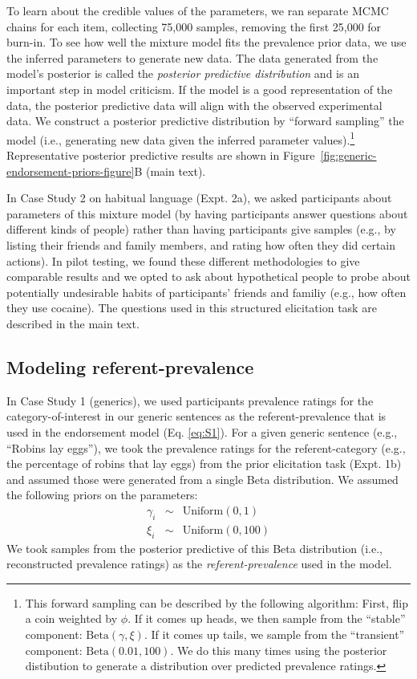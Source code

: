 \documentclass[english,,man,floatsintext]{apa6}
\let\rmarkdownfootnote\footnote%
\def\footnote{\protect\rmarkdownfootnote}
\theoremstyle{definition}
\theoremstyle{definition}
\theoremstyle{definition}
\theoremstyle{remark}
\begin{document}
To learn about the credible values of the parameters, we ran separate
MCMC chains for each item, collecting 75,000 samples, removing the first
25,000 for burn-in. To see how well the mixture model fits the
prevalence prior data, we use the inferred parameters to generate new
data. The data generated from the model's posterior is called the
\emph{posterior predictive distribution} and is an important step in
model criticism. If the model is a good representation of the data, the
posterior predictive data will align with the observed experimental
data. We construct a posterior predictive distribution by
\enquote{forward sampling} the model (i.e., generating new data given
the inferred parameter values).\footnote{This forward sampling can be
  described by the following algorithm: First, flip a coin weighted by
  \(\phi\). If it comes up heads, we then sample from the
  \enquote{stable} component: \(\text{Beta}(\gamma, \xi)\). If it comes
  up tails, we sample from the \enquote{transient} component:
  \(\text{Beta}(0.01, 100)\). We do this many times using the posterior
  distibution to generate a distribution over predicted prevalence
  ratings.} Representative posterior predictive results are shown in
Figure~\ref{fig:generic-endorsement-priors-figure}B (main text).

In Case Study 2 on habitual language (Expt. 2a), we asked participants
about parameters of this mixture model (by having participants answer
questions about different kinds of people) rather than having
participants give samples (e.g., by listing their friends and family
members, and rating how often they did certain actions). In pilot
testing, we found these different methodologies to give comparable
results and we opted to ask about hypothetical people to probe about
potentially undesirable habits of participants' friends and familiy
(e.g., how often they use cocaine). The questions used in this
structured elicitation task are described in the main text.

\hypertarget{modeling-referent-prevalence}{%
\subsection{Modeling
referent-prevalence}\label{modeling-referent-prevalence}}

In Case Study 1 (generics), we used participants prevalence ratings for
the category-of-interest in our generic sentences as the
referent-prevalence that is used in the endorsement model (Eq.
\ref{eq:S1}). For a given generic sentence (e.g., \enquote{Robins lay
eggs}), we took the prevalence ratings for the referent-category (e.g.,
the percentage of robins that lay eggs) from the prior elicitation task
(Expt. 1b) and assumed those were generated from a single Beta
distribution. We assumed the following priors on the parameters:
\begin{eqnarray*}
\gamma_i & \sim & \text{Uniform}(0, 1) \\
\xi_i & \sim & \text{Uniform}(0, 100)
\end{eqnarray*} We took samples from the posterior predictive of this
Beta distribution (i.e., reconstructed prevalence ratings) as the
\emph{referent-prevalence} used in the model.
\end{document}
